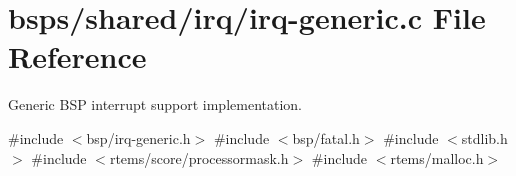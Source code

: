 \hypertarget{irq-generic_8c}{}\section{bsps/shared/irq/irq-\/generic.c File Reference}
\label{irq-generic_8c}


Generic B\+SP interrupt support implementation.  


{\ttfamily \#include $<$bsp/irq-\/generic.\+h$>$}\newline
{\ttfamily \#include $<$bsp/fatal.\+h$>$}\newline
{\ttfamily \#include $<$stdlib.\+h$>$}\newline
{\ttfamily \#include $<$rtems/score/processormask.\+h$>$}\newline
{\ttfamily \#include $<$rtems/malloc.\+h$>$}\newline
